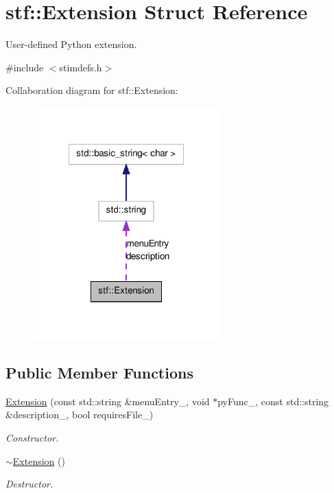 \hypertarget{structstf_1_1Extension}{
\section{stf::Extension Struct Reference}
\label{structstf_1_1Extension}
}


User-\/defined Python extension.  




{\ttfamily \#include $<$stimdefs.h$>$}



Collaboration diagram for stf::Extension:
\nopagebreak
\begin{figure}[H]
\begin{center}
\leavevmode
\includegraphics[width=204pt]{structstf_1_1Extension__coll__graph}
\end{center}
\end{figure}
\subsection*{Public Member Functions}
\begin{DoxyCompactItemize}
\item 
\hyperlink{structstf_1_1Extension_a279ba4a2a78e265c034450806715f789}{Extension} (const std::string \&menuEntry\_\-, void $\ast$pyFunc\_\-, const std::string \&description\_\-, bool requiresFile\_\-)
\begin{DoxyCompactList}\small\item\em Constructor. \item\end{DoxyCompactList}\item 
\hypertarget{structstf_1_1Extension_aa0e893a92ad0eca35620645ccadf12c1}{
\hyperlink{structstf_1_1Extension_aa0e893a92ad0eca35620645ccadf12c1}{$\sim$Extension} ()}
\label{structstf_1_1Extension_aa0e893a92ad0eca35620645ccadf12c1}

\begin{DoxyCompactList}\small\item\em Destructor. \item\end{DoxyCompactList}\end{DoxyCompactItemize}
